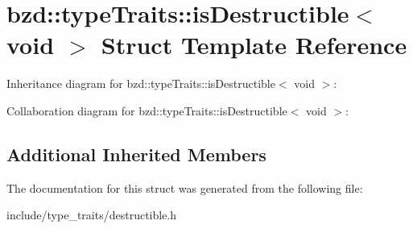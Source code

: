 \hypertarget{structbzd_1_1typeTraits_1_1isDestructible_3_01void_01_4}{}\section{bzd\+:\+:type\+Traits\+:\+:is\+Destructible$<$ void $>$ Struct Template Reference}
\label{structbzd_1_1typeTraits_1_1isDestructible_3_01void_01_4}


Inheritance diagram for bzd\+:\+:type\+Traits\+:\+:is\+Destructible$<$ void $>$\+:


Collaboration diagram for bzd\+:\+:type\+Traits\+:\+:is\+Destructible$<$ void $>$\+:
\subsection*{Additional Inherited Members}


The documentation for this struct was generated from the following file\+:\begin{DoxyCompactItemize}
\item 
include/type\+\_\+traits/destructible.\+h\end{DoxyCompactItemize}

